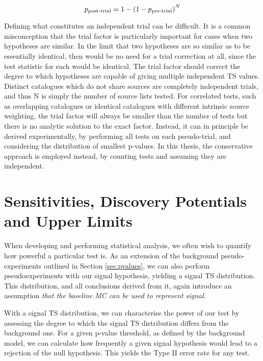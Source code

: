 \begin{equation}
p_{\textup{post-trial}} = 1 - \left( 1 - p_{\textup{pre-trial}} \right)^{N}
\label{eq:trial_correction}
\end{equation}

Defining what constitutes an independent trial can be difficult. It is a common misconception that the trial factor is particularly important for cases when two hypotheses are similar. In the limit that two hypotheses are so similar as to be essentially identical, then would be no need for a trial correction at all, since the test statistic for each would be identical. The trial factor should correct the degree to which hypotheses are capable of giving multiple independent TS values. Distinct catalogues which do not share sources are completely independent trials, and thus N is simply the number of source lists tested. For correlated tests, such as overlapping catalogues or identical catalogues with different intrinsic source weighting, the trial factor will always be smaller than the number of tests but there is no analytic solution to the exact factor. Instead, it can in principle be derived experimentally, by performing all tests on each pseudo-trial, and considering the distribution of smallest p-values. In this thesis, the conservative approach is employed instead, by counting tests and assuming they are independent.

\section{Sensitivities, Discovery Potentials and Upper Limits}
\label{sec:sens_uls}

When developing and performing statistical analysis, we often wish to quantify how powerful a particular test is. As an extension of the background pseudo-experiments outlined in Section \ref{sec:pvalues}, we can also perform pseudoexperiments with our signal hypothesis, yielding a signal TS distribution. This distribution, and all conclusions derived from it, again introduce an assumption \emph{that the baseline MC can be used to represent signal}. 

With a signal TS distribution, we can characterise the power of our test by assessing the degree to which the signal TS distribution differs from the background one. For a given p-value threshold, as defined by the background model, we can calculate how frequently a given signal hypothesis would lead to a rejection of the null hypothesis. This yields the Type II error rate for any test.


